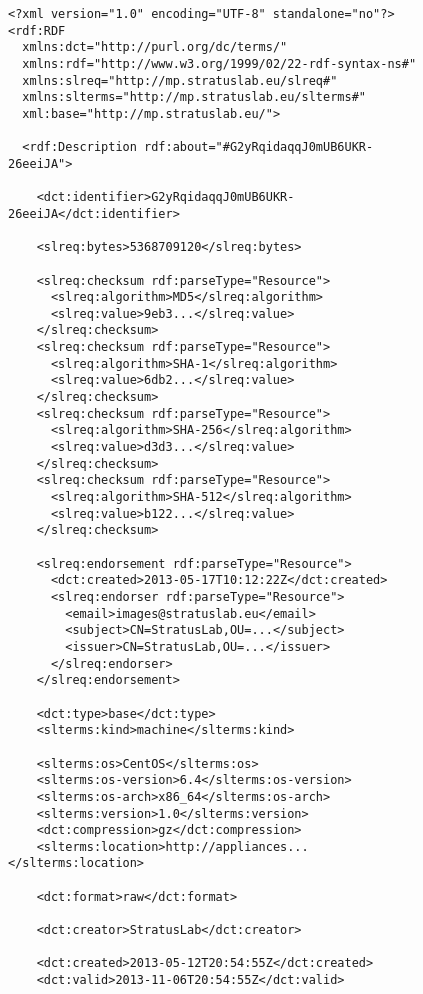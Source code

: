 \begin{figure}
\begin{center}
\scriptsize
\begin{verbatim}
<?xml version="1.0" encoding="UTF-8" standalone="no"?>
<rdf:RDF
  xmlns:dct="http://purl.org/dc/terms/"
  xmlns:rdf="http://www.w3.org/1999/02/22-rdf-syntax-ns#"
  xmlns:slreq="http://mp.stratuslab.eu/slreq#"
  xmlns:slterms="http://mp.stratuslab.eu/slterms#"
  xml:base="http://mp.stratuslab.eu/">
  
  <rdf:Description rdf:about="#G2yRqidaqqJ0mUB6UKR-26eeiJA">

    <dct:identifier>G2yRqidaqqJ0mUB6UKR-26eeiJA</dct:identifier>

    <slreq:bytes>5368709120</slreq:bytes>

    <slreq:checksum rdf:parseType="Resource">
      <slreq:algorithm>MD5</slreq:algorithm>
      <slreq:value>9eb3...</slreq:value>
    </slreq:checksum>
    <slreq:checksum rdf:parseType="Resource">
      <slreq:algorithm>SHA-1</slreq:algorithm>
      <slreq:value>6db2...</slreq:value>
    </slreq:checksum>
    <slreq:checksum rdf:parseType="Resource">
      <slreq:algorithm>SHA-256</slreq:algorithm>
      <slreq:value>d3d3...</slreq:value>
    </slreq:checksum>
    <slreq:checksum rdf:parseType="Resource">
      <slreq:algorithm>SHA-512</slreq:algorithm>
      <slreq:value>b122...</slreq:value>
    </slreq:checksum>
    
    <slreq:endorsement rdf:parseType="Resource">
      <dct:created>2013-05-17T10:12:22Z</dct:created>
      <slreq:endorser rdf:parseType="Resource">
        <email>images@stratuslab.eu</email>
        <subject>CN=StratusLab,OU=...</subject>
        <issuer>CN=StratusLab,OU=...</issuer>
      </slreq:endorser>
    </slreq:endorsement>

    <dct:type>base</dct:type>
    <slterms:kind>machine</slterms:kind>
    
    <slterms:os>CentOS</slterms:os>
    <slterms:os-version>6.4</slterms:os-version>
    <slterms:os-arch>x86_64</slterms:os-arch>
    <slterms:version>1.0</slterms:version>
    <dct:compression>gz</dct:compression>
    <slterms:location>http://appliances...</slterms:location>
    
    <dct:format>raw</dct:format>
    
    <dct:creator>StratusLab</dct:creator>
    
    <dct:created>2013-05-12T20:54:55Z</dct:created>
    <dct:valid>2013-11-06T20:54:55Z</dct:valid>
    

\end{verbatim}
\end{center}
\end{figure}
